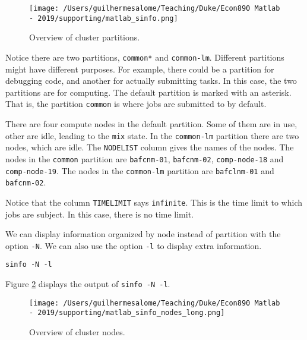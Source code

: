 \documentclass[12pt, a4paper]{article}
\begin{document}
\begin{figure}[H]
\centering
\texttt{[image: /Users/guilhermesalome/Teaching/Duke/Econ890 Matlab - 2019/supporting/matlab\_sinfo.png]}
\caption{\label{fig:org956fad3}
Overview of cluster partitions.}
\end{figure}

Notice there are two partitions, \texttt{common*} and \texttt{common-lm}.
Different partitions might have different purposes.
For example, there could be a partition for debugging code, and another for actually submitting tasks.
In this case, the two partitions are for computing.
The default partition is marked with an asterisk.
That is, the partition \texttt{common} is where jobs are submitted to by default.

There are four compute nodes in the default partition. Some of them are in use, other are idle, leading to the \texttt{mix} state.
In the \texttt{common-lm} partition there are two nodes, which are idle.
The \texttt{NODELIST} column gives the names of the nodes.
The nodes in the \texttt{common} partition are \texttt{bafcnm-01}, \texttt{bafcnm-02}, \texttt{comp-node-18} and \texttt{comp-node-19}.
The nodes in the \texttt{common-lm} partition are \texttt{bafclnm-01} and \texttt{bafcnm-02}.

Notice that the column \texttt{TIMELIMIT} says \texttt{infinite}.
This is the time limit to which jobs are subject.
In this case, there is no time limit.

We can display information organized by node instead of partition with the option \texttt{-N}. We can also use the option \texttt{-l} to display extra information.
\lstset{language=bash,label= ,caption= ,captionpos=b,firstnumber=1,numbers=left,style=bash}
\begin{lstlisting}
sinfo -N -l
\end{lstlisting}

Figure \ref{fig:org19f4b9a} displays the output of \texttt{sinfo -N -l}.
\begin{figure}[H]
\centering
\texttt{[image: /Users/guilhermesalome/Teaching/Duke/Econ890 Matlab - 2019/supporting/matlab\_sinfo\_nodes\_long.png]}
\caption{\label{fig:org19f4b9a}
Overview of cluster nodes.}
\end{figure}
\end{document}
